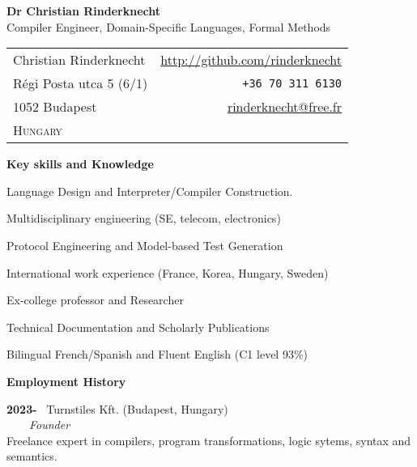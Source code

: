 \documentclass[a4paper,11pt]{article}
\begin{document}
\begin{center}
\textbf{\LARGE Dr Christian Rinderknecht}\\[5mm]
{\large Compiler Engineer, Domain-Specific Languages, Formal Methods}
\end{center}

\noindent
\begin{tabular}{@{}l@{\qquad\qquad\qquad\qquad}r@{}}
  Christian Rinderknecht
& \url{http://github.com/rinderknecht}\\
  Régi Posta utca 5 (6/1)
& \texttt{+36 70 311 6130}\\
  1052 Budapest
& \url{rinderknecht@free.fr}\\
  \textsc{Hungary}
&
\end{tabular}

\medskip


\pagestyle{empty}

\bigskip
\noindent\textbf{\large Key skills and Knowledge}
\begin{itemize*}

  \item Language Design and Interpreter/Compiler Construction.

  \item Multidisciplinary engineering (SE, telecom, electronics)

  \item Protocol Engineering and Model-based Test Generation

  \item International work experience (France, Korea, Hungary, Sweden)

  \item Ex-college professor and Researcher

  \item Technical Documentation and Scholarly Publications

  \item Bilingual French/Spanish and Fluent English (C1 level 93\%)

\end{itemize*}

\smallskip
\noindent\textbf{\large Employment History}
\bigskip

\noindent\textbf{2023-} \ \textsf{Turnstiles Kft.} (Budapest,
Hungary)\\ \ \ \ \ \emph{Founder}\\
Freelance expert in compilers, program transformations, logic sytems,
syntax and semantics.
\end{document}
